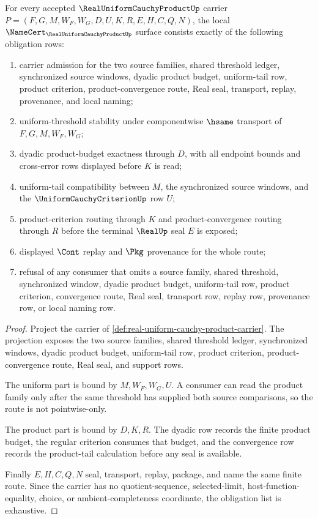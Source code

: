 \begin{theorem}
\label{thm:real-uniform-cauchy-product-namecert-obligations}
For every accepted $\RealUniformCauchyProductUp$ carrier $P=(F,G,M,W_F,W_G,D,U,K,R,E,H,C,Q,N)$, the local $\NameCert_{\RealUniformCauchyProductUp}$ surface consists exactly of the following obligation rows:
\begin{enumerate}
\item carrier admission for the two source families, shared threshold ledger, synchronized source windows, dyadic product budget, uniform-tail row, product criterion, product-convergence route, Real seal, transport, replay, provenance, and local naming;
\item uniform-threshold stability under componentwise $\hsame$ transport of $F,G,M,W_F,W_G$;
\item dyadic product-budget exactness through $D$, with all endpoint bounds and cross-error rows displayed before $K$ is read;
\item uniform-tail compatibility between $M$, the synchronized source windows, and the $\UniformCauchyCriterionUp$ row $U$;
\item product-criterion routing through $K$ and product-convergence routing through $R$ before the terminal $\RealUp$ seal $E$ is exposed;
\item displayed $\Cont$ replay and $\Pkg$ provenance for the whole route;
\item refusal of any consumer that omits a source family, shared threshold, synchronized window, dyadic product budget, uniform-tail row, product criterion, convergence route, Real seal, transport row, replay row, provenance row, or local naming row.
\end{enumerate}
\end{theorem}
\begin{proof}
Project the carrier of \autoref{def:real-uniform-cauchy-product-carrier}. The projection exposes the two source families, shared threshold ledger, synchronized windows, dyadic product budget, uniform-tail row, product criterion, product-convergence route, Real seal, and support rows.

The uniform part is bound by $M,W_F,W_G,U$. A consumer can read the product family only after the same threshold has supplied both source comparisons, so the route is not pointwise-only.

The product part is bound by $D,K,R$. The dyadic row records the finite product budget, the regular criterion consumes that budget, and the convergence row records the product-tail calculation before any seal is available.

Finally $E,H,C,Q,N$ seal, transport, replay, package, and name the same finite route. Since the carrier has no quotient-sequence, selected-limit, host-function-equality, choice, or ambient-completeness coordinate, the obligation list is exhaustive.
\end{proof}

